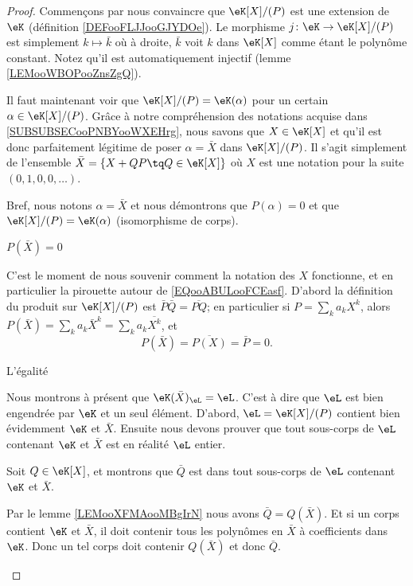 \begin{proof}
    Commençons par nous convaincre que \( \eK[X]/(P)\) est une extension de \( \eK\) (définition \ref{DEFooFLJJooGJYDOe}). Le morphisme \( j\colon \eK\to \eK[X]/(P)\) est simplement \( k\mapsto \bar k\) où à droite, \( \bar k\) voit \( k\) dans \( \eK[X]\) comme étant le polynôme constant. Notez qu'il est automatiquement injectif (lemme \ref{LEMooWBOPooZnsZgQ}).

    Il faut maintenant voir que \( \eK[X]/(P)=\eK(\alpha)\) pour un certain \( \alpha\in \eK[X]/(P)\). Grâce à notre compréhension des notations acquise dans \ref{SUBSUBSECooPNBYooWXEHrg}, nous savons que \( X\in\eK[X]\) et qu'il est donc parfaitement légitime de poser \( \alpha=\bar X\) dans \( \eK[X]/(P)\). Il s'agit simplement de l'ensemble \( \bar X=\{ X+QP\tq Q\in \eK[X] \}\) où \( X\) est une notation pour la suite \( (0,1,0,0,\ldots)\). 

    Bref, nous notons \( \alpha=\bar X\) et nous démontrons que \( P(\alpha)=0\) et que \( \eK[X]/(P)=\eK(\alpha)\) (isomorphisme de corps).
    \begin{subproof}
        \item[\( P(\bar X)=0\)]
        
            C'est le moment de nous souvenir comment la notation des \( X\) fonctionne, et en particulier la pirouette autour de \eqref{EQooABULooFCEasf}. D'abord la définition du produit sur \( \eK[X]/(P)\) est \( \bar P\bar Q=\overline{ PQ }\); en particulier si \( P=\sum_ka_kX^k\), alors \( P(\bar X)=\sum_ka_k\bar X^k=\sum_ka_k\overline{ X^k }\), et
            \begin{equation}
                P(\bar X)=\overline{ P(X) }=\bar P=0.
            \end{equation}
        \item[L'égalité]

            Nous montrons à présent que \( \eK(\bar X)_{\eL}=\eL\). C'est à dire que \( \eL\) est bien engendrée par \( \eK\) et un seul élément. D'abord, \( \eL=\eK[X]/(P)\) contient bien évidemment \( \eK\) et \( \bar X\). Ensuite nous devons prouver que tout sous-corps de \( \eL\) contenant \( \eK\) et \( \bar X\) est en réalité \( \eL\) entier.

            Soit \( Q\in \eK[X]\), et montrons que \( \bar Q\) est dans tout sous-corps de \( \eL\) contenant \( \eK\) et \( \bar X\). 
            
            Par le lemme \ref{LEMooXFMAooMBgIrN} nous avons \( \bar Q=Q(\bar X)\). Et si un corps contient \( \eK\) et \( \bar X\), il doit contenir tous les polynômes en \( \bar X\) à coefficients dans \( \eK\). Donc un tel corps doit contenir \( Q(\bar X)\) et donc \( \bar Q\).

    \end{subproof}
\end{proof}

